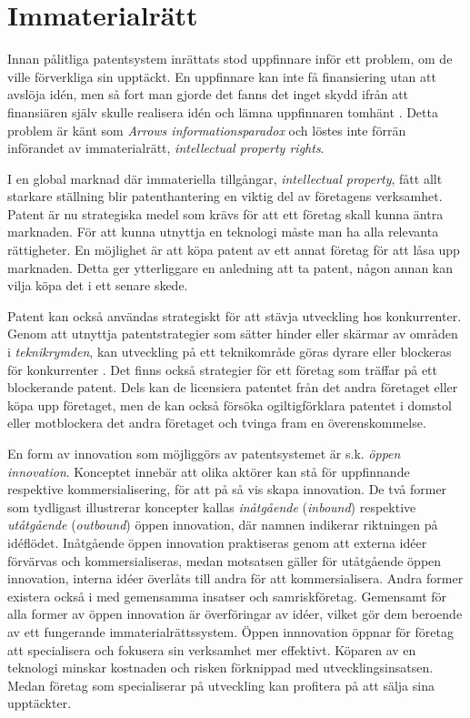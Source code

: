 \section{Immaterialrätt}
\label{sec:ip}

Innan pålitliga patentsystem inrättats stod uppfinnare inför ett problem, om de ville förverkliga sin upptäckt.
En uppfinnare kan inte få finansiering utan att avslöja idén, men så fort man gjorde det fanns det inget skydd ifrån att finansiären själv skulle realisera idén och lämna uppfinnaren tomhänt \cite{nard}.
Detta problem är känt som \emph{Arrows informationsparadox}\cite{arrow} och löstes inte förrän införandet av immaterialrätt, \emph{intellectual property rights}.

I en global marknad där immateriella tillgångar, \emph{intellectual property}, fått allt starkare ställning blir patenthantering en viktig del av företagens verksamhet.
Patent är nu strategiska medel som krävs för att ett företag skall kunna äntra marknaden.
För att kunna utnyttja en teknologi måste man ha alla relevanta rättigheter.
En möjlighet är att köpa patent av ett annat företag för att låsa upp marknaden.
Detta ger ytterliggare en anledning att ta patent, någon annan kan vilja köpa det i ett senare skede.

Patent kan också användas strategiskt för att stävja utveckling hos konkurrenter.
Genom att utnyttja patentstrategier som sätter hinder eller skärmar av områden i \emph{teknikrymden}, kan utveckling på ett teknikområde göras dyrare eller blockeras för konkurrenter \cite{ove}. Det finns också strategier för ett företag som träffar på ett blockerande patent. Dels kan de licensiera patentet från det andra företaget eller köpa upp företaget, men de kan också försöka ogiltigförklara patentet i domstol eller motblockera det andra företaget och tvinga fram en överenskommelse\cite{ove}. 

En form av innovation som möjliggörs av patentsystemet är s.k. \emph{öppen innovation}.
Konceptet innebär att olika aktörer kan stå för uppfinnande respektive kommersialisering, för att på så vis skapa innovation.
De två former som tydligast illustrerar koncepter kallas \emph{inåtgående} (\emph{inbound}) respektive \emph{utåtgående} (\emph{outbound}) öppen innovation, där namnen indikerar riktningen på idéflödet.
Inåtgående öppen innovation praktiseras genom att externa idéer förvärvas och kommersialiseras, medan motsatsen gäller för utåtgående öppen innovation, interna idéer överlåts till andra för att kommersialisera.
Andra former existera också i med gemensamma insatser och samriskföretag.
Gemensamt för alla former av öppen innovation är överföringar av idéer, vilket gör dem beroende av ett fungerande immaterialrättssystem.
Öppen innnovation öppnar för företag att specialisera och fokusera sin verksamhet mer effektivt.
Köparen av en teknologi minskar kostnaden och risken förknippad med utvecklingsinsatsen. 
Medan företag som specialiserar på utveckling kan profitera på att sälja sina upptäckter.
